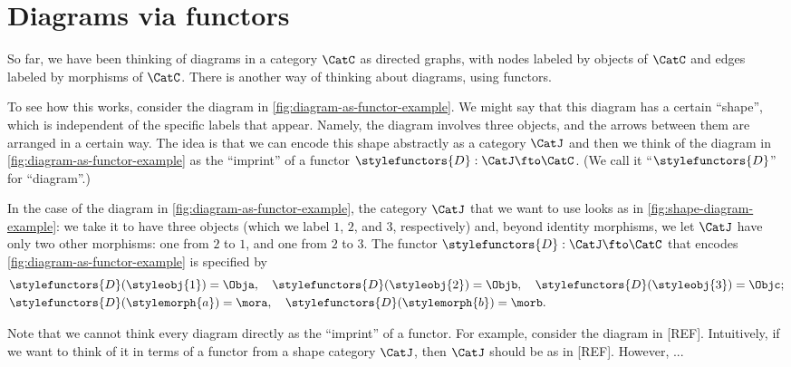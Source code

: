 
\section{Diagrams via functors}


So far, we have been thinking of diagrams in a category $\CatC$ as directed graphs, with nodes labeled by objects of $\CatC$ and edges labeled by morphisms of $\CatC$. There is another way of thinking about diagrams, using functors. 

To see how this works, consider the diagram in \cref{fig:diagram-as-functor-example}. We might say that this diagram has a certain ``shape'', which is independent of the specific labels that appear. Namely, the diagram involves three objects, and the arrows between them are arranged in a certain way. The idea is that we can encode this shape abstractly as a category $\CatJ$ and then we think of the diagram in \cref{fig:diagram-as-functor-example} as the ``imprint'' of a functor $\stylefunctors{D}: \CatJ \fto \CatC$. (We call it ``$\stylefunctors{D}$'' for ``diagram''.)

\begin{marginfigure}
    \centering
    \caption{}
    \label{fig:diagram-as-functor-example}
\end{marginfigure}

\begin{marginfigure}
    \centering
    \caption{}
    \label{fig:shape-diagram-example}
\end{marginfigure}



In the case of the diagram in \cref{fig:diagram-as-functor-example}, the category $\CatJ$ that we want to use looks as in \cref{fig:shape-diagram-example}: we take it to have three objects (which we label $1$, $2$, and $3$, respectively) and, beyond identity morphisms, we let $\CatJ$ have only two other morphisms: one from $2$ to $1$, and one from $2$ to $3$. The functor $\stylefunctors{D}: \CatJ \fto \CatC$ that encodes \cref{fig:diagram-as-functor-example} is specified by 
\begin{align*}
& \stylefunctors{D}(\styleobj{1}) = \Obja, \quad \stylefunctors{D}(\styleobj{2}) = \Objb, \quad  \stylefunctors{D}(\styleobj{3}) = \Objc;  \\
& \stylefunctors{D}(\stylemorph{a}) = \mora, \quad \stylefunctors{D}(\stylemorph{b}) = \morb.
\end{align*}

Note that we cannot think every diagram directly as the ``imprint'' of a functor. For example, consider the diagram in [REF]. Intuitively, if we want to think of it in terms of a functor from a shape category $\CatJ$, then $\CatJ$ should be as in [REF]. However, ... 


